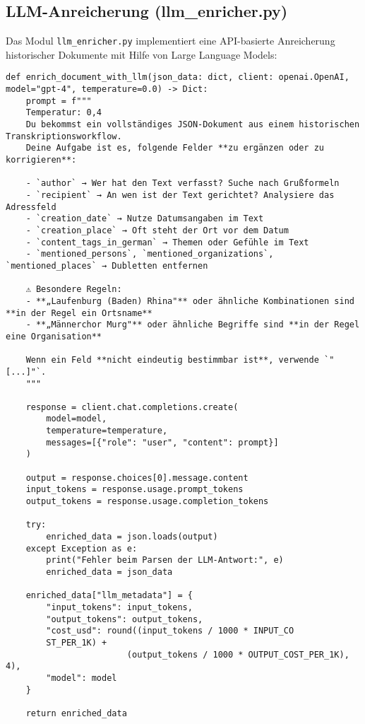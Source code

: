 \documentclass{article}
\begin{document}
\subsection{LLM-Anreicherung (llm\_enricher.py)}
Das Modul \texttt{llm\_enricher.py} implementiert eine API-basierte Anreicherung historischer Dokumente mit Hilfe von Large Language Models:

\begin{tcolorbox}[title=LLM-basierte Datenanreicherung]
\begin{lstlisting}[style=pythonstyle]
def enrich_document_with_llm(json_data: dict, client: openai.OpenAI, model="gpt-4", temperature=0.0) -> Dict:
    prompt = f""" 
    Temperatur: 0,4  
    Du bekommst ein vollständiges JSON-Dokument aus einem historischen Transkriptionsworkflow.  
    Deine Aufgabe ist es, folgende Felder **zu ergänzen oder zu korrigieren**:

    - `author` → Wer hat den Text verfasst? Suche nach Grußformeln
    - `recipient` → An wen ist der Text gerichtet? Analysiere das Adressfeld
    - `creation_date` → Nutze Datumsangaben im Text
    - `creation_place` → Oft steht der Ort vor dem Datum
    - `content_tags_in_german` → Themen oder Gefühle im Text
    - `mentioned_persons`, `mentioned_organizations`, `mentioned_places` → Dubletten entfernen

    ⚠️ Besondere Regeln:
    - **„Laufenburg (Baden) Rhina"** oder ähnliche Kombinationen sind **in der Regel ein Ortsname**
    - **„Männerchor Murg"** oder ähnliche Begriffe sind **in der Regel eine Organisation**

    Wenn ein Feld **nicht eindeutig bestimmbar ist**, verwende `"[...]"`.
    """
    
    response = client.chat.completions.create(
        model=model,
        temperature=temperature,
        messages=[{"role": "user", "content": prompt}]
    )

    output = response.choices[0].message.content
    input_tokens = response.usage.prompt_tokens
    output_tokens = response.usage.completion_tokens

    try:
        enriched_data = json.loads(output)
    except Exception as e:
        print("Fehler beim Parsen der LLM-Antwort:", e)
        enriched_data = json_data

    enriched_data["llm_metadata"] = {
        "input_tokens": input_tokens,
        "output_tokens": output_tokens,
        "cost_usd": round((input_tokens / 1000 * INPUT_CO
        ST_PER_1K) + 
                        (output_tokens / 1000 * OUTPUT_COST_PER_1K), 4),
        "model": model
    }

    return enriched_data
\end{lstlisting}
\end{tcolorbox}
\end{document}
